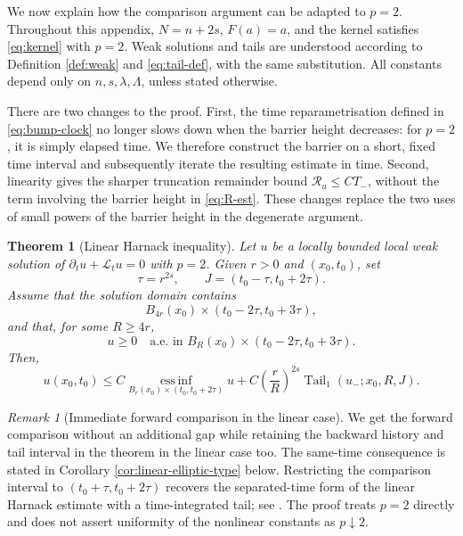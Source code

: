 \documentclass[10pt]{amsart}
\theoremstyle{plain}
\newtheorem{theorem}[lemma]{Theorem}
\theoremstyle{definition}
\theoremstyle{remark}
\newtheorem{remark}[lemma]{Remark}
\numberwithin{equation}{section}
\begin{document}
We now explain how the comparison argument can be adapted to $p=2$.
Throughout this appendix, $N=n+2s$, $F(a)=a$, and the kernel satisfies
\eqref{eq:kernel} with $p=2$. Weak solutions and tails are understood
according to Definition \ref{def:weak} and \eqref{eq:tail-def}, with
the same substitution. All constants depend only on
$n,s,\lambda,\Lambda$, unless stated otherwise.

There are two changes to the proof. First, the time reparametrisation defined in
\eqref{eq:bump-clock} no longer slows down when the barrier height
decreases: for $p=2$, it is simply elapsed time. We therefore construct
the barrier on a short, fixed time interval and subsequently iterate
the resulting estimate in time. Second, linearity gives the sharper
truncation remainder bound $\mathcal R_u\le C T_-$, without the term involving the
barrier height in \eqref{eq:R-est}. These changes replace the two uses of small powers
of the barrier height in the degenerate argument.

\begin{theorem}[Linear Harnack inequality]\label{thm:linear-harnack}
Let $u$ be a locally bounded local weak solution of
$\partial_tu+\mathcal L_tu=0$ with $p=2$. Given $r>0$ and $(x_0,t_0)$,
set
\[
\tau=r^{2s},\qquad J=(t_0-\tau,t_0+2\tau).
\]
Assume that the solution domain contains
\[
B_{4r}(x_0)\times(t_0-2\tau,t_0+3\tau),
\]
and that, for some $R\ge4r$,
\[
u\ge0\quad\text{a.e. in }
B_R(x_0)\times(t_0-2\tau,t_0+3\tau).
\]
Then,
\begin{equation}\label{eq:linear-harnack}
u(x_0,t_0)
\le C\operatorname*{ess\,inf}_{B_r(x_0)\times(t_0,t_0+2\tau)}u
+C\left(\frac rR\right)^{2s}
\operatorname{Tail}_1(u_-;x_0,R,J).
\end{equation}
\end{theorem}

\begin{remark}[Immediate forward comparison in the linear case]
\label{rem:linear-no-gap}
We get the forward
comparison without an additional gap while retaining the backward
history and tail interval in the theorem in the linear case too.
The same-time consequence is stated in
Corollary \ref{cor:linear-elliptic-type} below.
Restricting the comparison interval to $(t_0+\tau,t_0+2\tau)$
recovers the separated-time form of the linear Harnack estimate
with a time-integrated tail; see \cite{KassmannWeidner}.
The proof treats $p=2$ directly and does not assert uniformity of
the nonlinear constants as $p\downarrow2$.
\end{remark}
\end{document}
